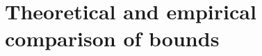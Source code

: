 \documentclass{article}
\theoremstyle{definition}
\newtheorem{theorem}{Theorem}[section]
\newcommand{\LF}[1]{\textcolor{blue}{\{LF: #1\}}}
\begin{document}
%
%
%
%
%
%	
%	
%


\section{Theoretical and empirical comparison of bounds}
\end{document}
